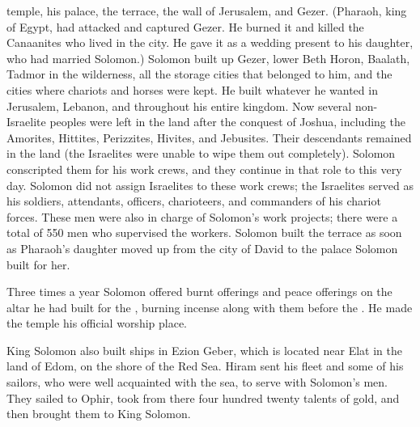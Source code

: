 {temple,
his palace,
the
terrace,
the
wall
of Jerusalem,
and Gezer.
(Pharaoh,
king
of Egypt,
had attacked
and captured
Gezer.
He burned
it and killed
the Canaanites
who lived
in the city.
He gave
it as a wedding present
to his daughter,
who had married
Solomon.)
Solomon
built
up Gezer,
lower
Beth Horon,
Baalath,
Tadmor
in the wilderness,
all
the storage
cities
that belonged
to him,
and the cities
where chariots
and horses
were kept. He built
whatever
he
wanted
in Jerusalem,
Lebanon,
and throughout
his entire
kingdom.
Now several
non-Israelite
peoples
were left
in the land after the conquest of Joshua, including
the Amorites,
Hittites,
Perizzites,
Hivites,
and Jebusites.
Their descendants
remained
in the land
(the Israelites
were unable
to wipe
them out completely). Solomon
conscripted
them for his work crews,
and they
continue in that role
to
this
very
day.
Solomon
did not
assign
Israelites
to these work crews;
the Israelites served
as his soldiers,
attendants,
officers,
charioteers,
and commanders
of his chariot
forces.
These
men
were also in charge
of Solomon’s
work
projects; there were a total of 550
men
who supervised
the workers.
Solomon built
the terrace
as soon as Pharaoh’s
daughter
moved up
from the city
of David
to
the palace
Solomon built for her.
\par }{\PP {}Three
times
a year
Solomon
offered
burnt offerings
and peace offerings
on
the altar
he had
built
for the
{}, burning incense
along with
them before
the {}. He made the
temple
his official worship place.
\par }{\PP {}King
Solomon
also built
ships
in Ezion Geber,
which
is located near
Elat
in the land
of Edom,
on
the shore
of the Red
Sea.
Hiram
sent
his fleet
and some
of his sailors,
who were
well acquainted
with
the sea,
to serve
with
Solomon’s
men.
They sailed
to Ophir,
took
from there
four
hundred
twenty
talents
of gold,
and then brought
them to
King
Solomon.

}
